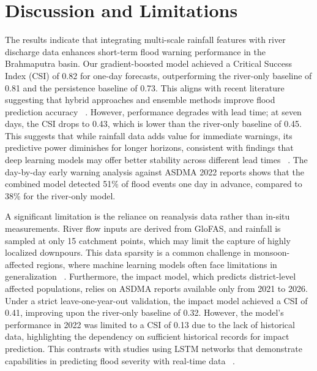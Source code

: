 \documentclass[conference]{IEEEtran}
\begin{document}
\section{Discussion and Limitations}
The results indicate that integrating multi-scale rainfall features with river discharge data enhances short-term flood warning performance in the Brahmaputra basin. Our gradient-boosted model achieved a Critical Success Index (CSI) of 0.82 for one-day forecasts, outperforming the river-only baseline of 0.81 and the persistence baseline of 0.73. This aligns with recent literature suggesting that hybrid approaches and ensemble methods improve flood prediction accuracy ~\cite{mosavi2018c1,kan2020c7}. However, performance degrades with lead time; at seven days, the CSI drops to 0.43, which is lower than the river-only baseline of 0.45. This suggests that while rainfall data adds value for immediate warnings, its predictive power diminishes for longer horizons, consistent with findings that deep learning models may offer better stability across different lead times ~\cite{hu2018c19}. The day-by-day early warning analysis against ASDMA 2022 reports shows that the combined model detected 51\% of flood events one day in advance, compared to 38\% for the river-only model.

A significant limitation is the reliance on reanalysis data rather than in-situ measurements. River flow inputs are derived from GloFAS, and rainfall is sampled at only 15 catchment points, which may limit the capture of highly localized downpours. This data sparsity is a common challenge in monsoon-affected regions, where machine learning models often face limitations in generalization ~\cite{bayat2020c11}. Furthermore, the impact model, which predicts district-level affected populations, relies on ASDMA reports available only from 2021 to 2026. Under a strict leave-one-year-out validation, the impact model achieved a CSI of 0.41, improving upon the river-only baseline of 0.32. However, the model's performance in 2022 was limited to a CSI of 0.13 due to the lack of historical data, highlighting the dependency on sufficient historical records for impact prediction. This contrasts with studies using LSTM networks that demonstrate capabilities in predicting flood severity with real-time data ~\cite{mourot2022c14}.
\end{document}
